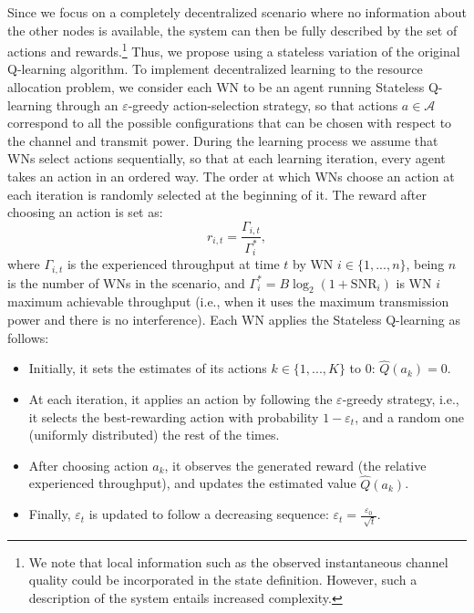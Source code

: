 \documentclass[conference]{IEEEtran}
\begin{document}
	Since we focus on a completely decentralized scenario where no information about the other nodes is available, the system can then be fully described by the set of actions and rewards.\footnote{We note that local information such as the observed instantaneous channel quality could be incorporated in the state definition. However, such a description of the system entails increased complexity.} Thus, we propose using a stateless variation of the original Q-learning algorithm. To implement decentralized learning to the resource allocation problem, we consider each WN to be an agent running Stateless Q-learning through an $\varepsilon$-greedy action-selection strategy, so that actions $a \in \mathcal{A}$ correspond to all the possible configurations that can be chosen with respect to the channel and transmit power. During the learning process we assume that WNs select actions sequentially, so that at each learning iteration, every agent takes an action in an ordered way. The order at which WNs choose an action at each iteration is randomly selected at the beginning of it. The reward after choosing an action is set as:
	\begin{equation}
	r_{i,t} = \frac{\Gamma_{i,t}}{\Gamma_i^*},
	\label{eq:reward_generation}
	\nonumber
	\end{equation}
	where $\Gamma_{i,t}$ is the experienced throughput at time $t$ by WN $i \in \{1,...,n\}$, being $n$ is the number of WNs in the scenario, and $\Gamma_{i}^* = B \log_{2}(1 + \text{SNR}_{i})$ is WN $i$ maximum achievable throughput (i.e., when it uses the maximum transmission power and there is no interference).	Each WN applies the Stateless Q-learning as follows: 
	\begin{itemize}
		\item Initially, it sets the estimates of its actions $k \in \{1,...,K\}$ to 0: $\hat{Q}(a_k) = 0$.
		\item At each iteration, it applies an action by following the $\varepsilon$-greedy strategy, i.e., it selects the best-rewarding action with probability $1 - \varepsilon_t$, and a random one (uniformly distributed) the rest of the times.
		\item After choosing action $a_k$, it observes the generated reward (the relative experienced throughput), and updates the estimated value $\hat{Q}(a_k)$.
		\item Finally, $\varepsilon_t$ is updated to follow a decreasing sequence: $\varepsilon_t = \frac{\varepsilon_0}{\sqrt[]{t}}$.
	\end{itemize}	
\end{document}
